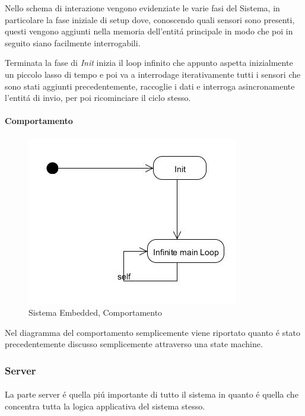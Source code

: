 Nello schema di interazione vengono evidenziate le varie fasi del Sistema, in particolare la fase iniziale di setup dove, conoscendo quali sensori sono presenti, questi vengono aggiunti nella memoria dell'entit\'a principale in modo che poi in seguito siano facilmente interrogabili.

Terminata la fase di \textit{Init} inizia il loop infinito che appunto aspetta inizialmente un piccolo lasso di tempo e poi va a interrodage iterativamente tutti i sensori che sono stati aggiunti precedentemente, raccoglie i dati e interroga asincronamente l'entit\'a di invio, per poi ricominciare il ciclo stesso.

\paragraph{Comportamento}

\begin{figure}[ht]
\centering
\includegraphics[scale=0.5]{Figures/DomainModel/EmbeddedSystem/Behaviour.jpg}
\caption{Sistema Embedded, Comportamento}
\end{figure}


Nel diagramma del comportamento semplicemente viene riportato quanto \'e stato precedentemente discusso semplicemente attraverso una state machine.

\subsubsection{Server}

\paragraph{}La parte server \'e quella pi\'u importante di tutto il sistema in quanto \'e quella che concentra tutta la logica applicativa del sistema stesso.

